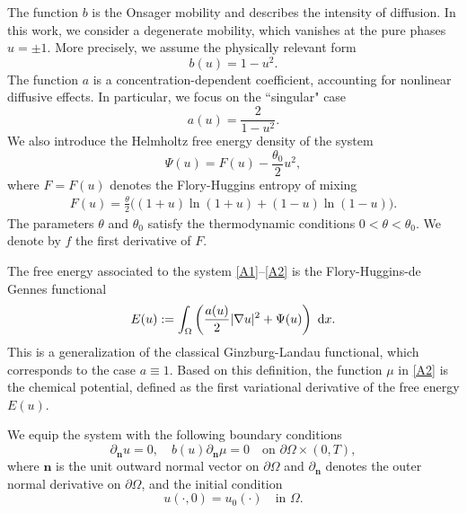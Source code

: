 \documentclass[11pt,  reqno]{amsart}%
\theoremstyle{plain}
\theoremstyle{definition}
\theoremstyle{remark}
\numberwithin{equation}{section}
\newcommand{\dx}{\textup{d}x}
\begin{document}
The function $b$ is the Onsager mobility and describes the intensity of diffusion. In this work, we consider a degenerate mobility, which vanishes at the pure phases $u=\pm1$.
More precisely, we assume the physically relevant form
\begin{equation}
\label{b}
 b(u)= 1-u^2.
\end{equation}
The function $a$ is a concentration-dependent coefficient, accounting for nonlinear diffusive effects. In particular, we focus on the ``singular" case
    \begin{equation}
        \label{a}
        a(u)= \dfrac{2}{1-u^2}.
    \end{equation} 
We also introduce the Helmholtz free energy density of the system
    \begin{equation}
        \label{Psi}
        \Psi(u)= F(u)-\dfrac{\theta_0}{2}u^2,
    \end{equation}
	where $F=F(u)$ denotes the Flory-Huggins  entropy of mixing
	\begin{align}
    \label{FL-pot}
		F(u) = \frac{\theta}{2} \bigg((1+u) \ln (1+u) + (1-u) \ln (1-u)\bigg).
	\end{align}
The parameters $\theta$ and $\theta_0$ satisfy the thermodynamic conditions $0< \theta < \theta_0$. We denote by $f$ the first derivative of $F$. 
   
The free energy associated to the system \eqref{A1}--\eqref{A2} is the Flory-Huggins-de Gennes functional
\begin{equation}
\label{FHG}
 E(u) :=\int_{\Omega} \left( \frac{a(u)}{2} |\nabla u|^2 +   \Psi(u) \right) \ \dx.
 \end{equation} 
This is a generalization of the classical Ginzburg-Landau functional, which corresponds to the case $a \equiv 1$. Based on this definition, the function $\mu$ in \eqref{A2} is the chemical potential, defined as the first variational derivative of the free energy $E(u)$.

We equip the system with the following boundary conditions
\begin{equation} \label{boundary conditions}
        \partial_{\mathbf{n}} u=0, \quad b(u)\partial_{\mathbf{n}}\mu = 0 \quad \text{on } \partial \Omega\times (0,T), 
\end{equation}
   where $\mathbf{n}$ is the unit outward normal vector on $\partial \Omega$ and $\partial_{\mathbf{n}}$ denotes the outer normal derivative on $\partial \Omega$,
and the initial condition
\begin{equation}
 \label{initial conditions}
u( \cdot, 0) = u_0(\cdot)  \quad \text{in } \Omega.
\end{equation}  
\end{document}
